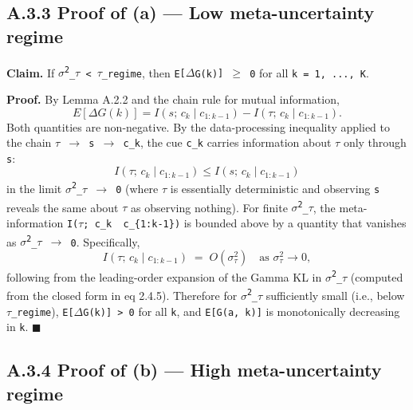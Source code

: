 \documentclass{article}
\begin{document}
\subsection{A.3.3 Proof of (a) --- Low meta-uncertainty
regime}\label{a.3.3-proof-of-a-low-meta-uncertainty-regime}

\textbf{Claim.} If \texttt{\ensuremath{\sigma}\textsuperscript{2}\_\ensuremath{\tau}\ \textless{}\ \ensuremath{\tau}\_regime}, then
\texttt{E{[}\ensuremath{\Delta}G(k){]}\ \ensuremath{\geq}\ 0} for all \texttt{k\ =\ 1,\ ...,\ K}.

\textbf{Proof.} By Lemma A.2.2 and the chain rule for mutual
information, \[
E[\Delta G(k)] = I(s;\, c_k \mid c_{1:k-1}) - I(\tau;\, c_k \mid c_{1:k-1}).
\] Both quantities are non-negative. By the data-processing inequality
applied to the chain \texttt{\ensuremath{\tau}\ \ensuremath{\rightarrow}\ s\ \ensuremath{\rightarrow}\ c\_k}, the cue \texttt{c\_k}
carries information about \texttt{\ensuremath{\tau}} only through \texttt{s}: \[
I(\tau;\, c_k \mid c_{1:k-1}) \leq I(s;\, c_k \mid c_{1:k-1})
\] in the limit \texttt{\ensuremath{\sigma}\textsuperscript{2}\_\ensuremath{\tau}\ \ensuremath{\rightarrow}\ 0} (where \texttt{\ensuremath{\tau}} is essentially
deterministic and observing \texttt{s} reveals the same about \texttt{\ensuremath{\tau}}
as observing nothing). For finite \texttt{\ensuremath{\sigma}\textsuperscript{2}\_\ensuremath{\tau}}, the meta-information
\texttt{I(\ensuremath{\tau};\ c\_k\ \textbar{}\ c\_\{1:k-1\})} is bounded above by a
quantity that vanishes as \texttt{\ensuremath{\sigma}\textsuperscript{2}\_\ensuremath{\tau}\ \ensuremath{\rightarrow}\ 0}. Specifically, \[
I(\tau;\, c_k \mid c_{1:k-1}) \;=\; O(\sigma^2_\tau) \quad \text{as } \sigma^2_\tau \to 0,
\] following from the leading-order expansion of the Gamma KL in
\texttt{\ensuremath{\sigma}\textsuperscript{2}\_\ensuremath{\tau}} (computed from the closed form in eq 2.4.5). Therefore
for \texttt{\ensuremath{\sigma}\textsuperscript{2}\_\ensuremath{\tau}} sufficiently small (i.e., below \texttt{\ensuremath{\tau}\_regime}),
\texttt{E{[}\ensuremath{\Delta}G(k){]}\ \textgreater{}\ 0} for all \texttt{k}, and
\texttt{E{[}G(a,\ k){]}} is monotonically decreasing in \texttt{k}. \ensuremath{\blacksquare}

\subsection{A.3.4 Proof of (b) --- High meta-uncertainty
regime}\label{a.3.4-proof-of-b-high-meta-uncertainty-regime}
\end{document}
